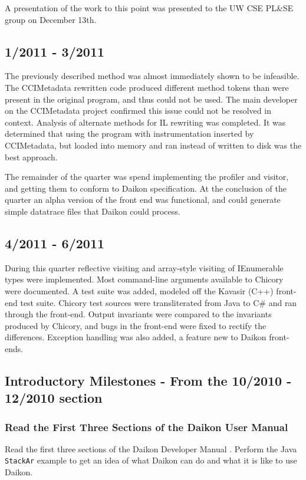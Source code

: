 \documentclass{article}
\begin{document}
A presentation of the work to this point was presented to the UW CSE PL\&SE group on December 13th.
\subsection{1/2011 - 3/2011}
The previously described method was almost immediately shown to be infeasible. The CCIMetadata rewritten code produced different method tokens than were present in the original program, and thus could not be used. The main developer on the CCIMetadata project confirmed this issue could not be resolved in context. Analysis of alternate methods for IL rewriting was completed. It was determined that using the program with instrumentation inserted by CCIMetadata, but loaded into memory and ran instead of written to disk was the best approach.

The remainder of the quarter was spend implementing the profiler and visitor, and getting them to conform to Daikon specification. At the conclusion of the quarter an alpha version of the front end was functional, and could generate simple datatrace files that Daikon could process.

\subsection{4/2011 - 6/2011}
During this quarter reflective visiting and array-style visiting of IEnumerable types were implemented. Most command-line arguments available to Chicory were documented. A test suite was added, modeled off the Kavasir (C++) front-end test suite. Chicory test sources were transliterated from Java to C\# and ran through the front-end. Output invariants were compared to the invariants produced by Chicory, and bugs in the front-end were fixed to rectify the differences. Exception handling was also added, a feature new to Daikon front-ends.

\subsection{Introductory Milestones - From the 10/2010 - 12/2010 section}

\subsubsection{Read the First Three Sections of the Daikon User Manual}
Read the first three sections of the Daikon Developer Manual \cite{DaikonUserManual:Online}. Perform the Java \verb|StackAr| example to get an idea of what Daikon can do and what it is like to use Daikon.
\end{document}
